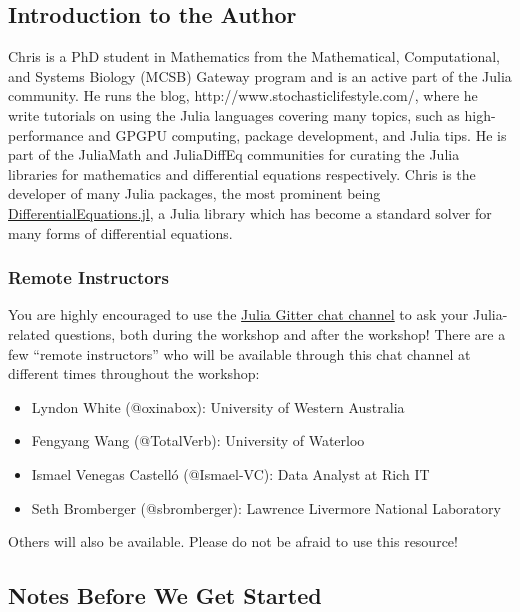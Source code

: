 \documentclass[11pt]{article}
\begin{document}
    \subsection{Introduction to the
Author}\label{introduction-to-the-author}

Chris is a PhD student in Mathematics from the Mathematical,
Computational, and Systems Biology (MCSB) Gateway program and is an
active part of the Julia community. He runs the blog,
http://www.stochasticlifestyle.com/, where he write tutorials on using
the Julia languages covering many topics, such as high-performance and
GPGPU computing, package development, and Julia tips. He is part of the
JuliaMath and JuliaDiffEq communities for curating the Julia libraries
for mathematics and differential equations respectively. Chris is the
developer of many Julia packages, the most prominent being
\href{https://github.com/JuliaDiffEq/DifferentialEquations.jl}{DifferentialEquations.jl},
a Julia library which has become a standard solver for many forms of
differential equations.

\subsubsection{Remote Instructors}\label{remote-instructors}

You are highly encouraged to use the
\href{https://gitter.im/JuliaLang/julia}{Julia Gitter chat channel} to
ask your Julia-related questions, both during the workshop and after the
workshop! There are a few ``remote instructors'' who will be available
through this chat channel at different times throughout the workshop:

\begin{itemize}
\itemsep1pt\parskip0pt
\item
  Lyndon White (@oxinabox): University of Western Australia
\item
  Fengyang Wang (@TotalVerb): University of Waterloo
\item
  Ismael Venegas Castelló (@Ismael-VC): Data Analyst at Rich IT
\item
  Seth Bromberger (@sbromberger): Lawrence Livermore National Laboratory
\end{itemize}

Others will also be available. Please do not be afraid to use this
resource!

    \subsection{Notes Before We Get
Started}\label{notes-before-we-get-started}
\end{document}
